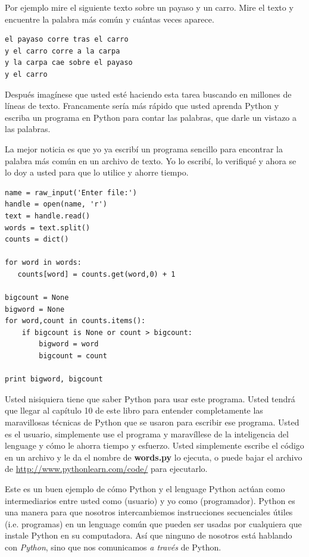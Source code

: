 Por ejemplo mire el siguiente texto sobre un payaso y un carro. Mire el texto y encuentre la palabra m\'as com\'un y cu\'antas veces aparece.

\beforeverb
\begin{verbatim}
el payaso corre tras el carro 
y el carro corre a la carpa 
y la carpa cae sobre el payaso 
y el carro
\end{verbatim}
\afterverb
%
Despu\'es imag\'inese que usted est\'e haciendo esta tarea buscando en millones de l\'ineas de texto. 
Francamente ser\'ia m\'as r\'apido que usted aprenda Python y escriba un programa en Python para contar las palabras, que darle un vistazo a las palabras.

La mejor noticia es que yo ya escrib\'i un programa sencillo para encontrar la palabra m\'as com\'un en un archivo de texto. Yo lo escrib\'i, lo verifiqu\'e y ahora se lo doy a usted para que lo utilice y ahorre tiempo.

\beforeverb
\begin{verbatim}
name = raw_input('Enter file:')
handle = open(name, 'r')
text = handle.read()
words = text.split()
counts = dict()

for word in words:
   counts[word] = counts.get(word,0) + 1

bigcount = None
bigword = None
for word,count in counts.items():
    if bigcount is None or count > bigcount:
        bigword = word
        bigcount = count

print bigword, bigcount
\end{verbatim}
\afterverb
%
Usted nisiquiera tiene que saber Python para usar este programa. Usted tendr\'a que llegar al cap\'itulo 10 de este libro para entender completamente las maravillosas t\'ecnicas de Python que se usaron para escribir ese programa. Usted es el usuario, simplemente use el programa y marav\'illese de la inteligencia del lenguage y c\'omo le ahorra tiempo y esfuerzo.
Usted simplemente escribe el c\'odigo en un archivo y le da el nombre de  
{\bf words.py} lo ejecuta, o puede bajar el archivo de \url{http://www.pythonlearn.com/code/} para ejecutarlo.

Este es un buen ejemplo de c\'omo Python y el lenguage Python act\'uan como intermediarios entre usted
como (usuario) y yo como (programador). Python es una manera para que nosotros intercambiemos instrucciones secuenciales \'utiles (i.e. programas) en un lenguage com\'un que pueden ser usadas por cualquiera que instale Python en su computadora. As\'i que ninguno de nosotros est\'a hablando con {\em Python},
sino que nos comunicamos {\em a trav\'es} de Python.

